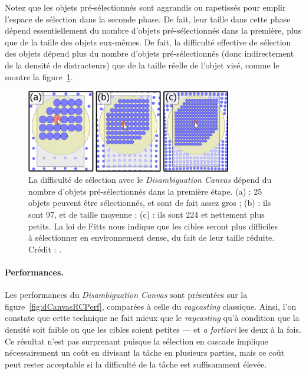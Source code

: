 	Notez que les objets pré-sélectionnés sont aggrandis ou rapetissés pour emplir l'espace de sélection dans la seconde phase. De fait, leur taille dans cette phase dépend essentiellement du nombre d'objets pré-sélectionnés dans la première, plus que de la taille des objets eux-mêmes. De fait, la difficulté effective de sélection des objets dépend plus du nombre d'objets pré-sélectionnés (donc indirectement de la densité de distracteurs) que de la taille réelle de l'objet visé, comme le montre la figure~\ref{fig:dCanvasDensity}.
	
	\begin{figure}[!htb]
		\centering
		\includegraphics[width=0.80\textwidth]{figures/ch2/dCanvasDensity}
		\caption[\emph{Disambiguation Canvas} -- densité]{La difficulté de sélection avec le \emph{Disambiguation Canvas} dépend du nombre d'objets pré-sélectionnés dans la première étape. (a) : 25 objets peuvent être sélectionnés, et sont de fait assez gros ; (b) : ils sont 97, et de taille moyenne ; (c) : ils sont 224 et nettement plus petits. La loi de Fitts nous indique que les cibles seront plus difficiles à sélectionner en environnement dense, du fait de leur taille réduite. Crédit : \cite{debarba2013disambiguation}.}
		\label{fig:dCanvasDensity}
	\end{figure}
	
	\paragraph{Performances.}
	Les performances du \emph{Disambiguation Canvas} sont présentées sur la figure~\ref{fig:dCanvasRCPerf}, comparées à celle du \emph{raycasting} classique. Ainsi, l'on constate que cette technique ne fait mieux que le \emph{raycasting} qu'à condition que la densité soit faible ou que les cibles soient petites --- et \emph{a fortiori} les deux à la fois. Ce résultat n'est pas surprenant puisque la sélection en cascade implique nécessairement un coût en divisant la tâche en plusieurs parties, mais ce coût peut rester acceptable si la difficulté de la tâche est suffisamment élevée.
	
